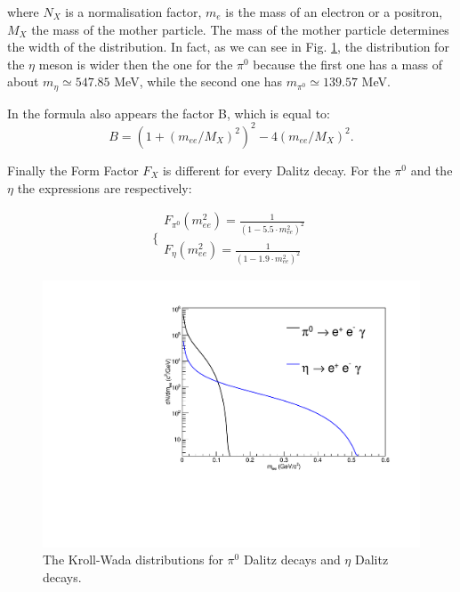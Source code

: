 \documentclass[a4paper,twocolumn,gsifonts,twoside]{gsipaper}
\begin{document}
where $N_{X}$ is a normalisation factor, $m_{e}$ is the mass of an electron or a positron, $M_{X}$ the mass of the mother particle.
The mass of the mother particle determines the width of the distribution. In fact, as we can see in Fig. \ref{kroll-wada}, the 
distribution for the $\eta$ meson is wider then the one for the $\pi^{0}$ because the first one has a mass of about $m_{\eta} \simeq 547.85$ 
MeV, while the second one has $m_{\pi^{0}} \simeq 139.57$ MeV.

In the formula also appears the factor B, which is equal to:
\vspace{0.2cm}
\begin{equation}
B=(1+(m_{ee}/M_{X})^{2})^2-4(m_{ee}/M_{X})^{2}.
\label{kroll_wada}
\end{equation}
\vspace{0.2cm}

Finally the Form Factor $F_{X}$ is different for every Dalitz decay. For the $\pi^{0}$ and the $\eta$ the expressions are respectively:

\vspace{0.2cm}
\begin{equation}
\Bigg\{
\begin{array}{rl}
F_{\pi^{0}}(m_{ee}^2) = \frac{1}{(1-5.5\cdot m_{ee}^2)^{2}}\\
F_{\eta}(m_{ee}^2) = \frac{1}{(1-1.9\cdot m_{ee}^2)^{2}}
\label{formfactors}
\end{array}
\end{equation}

\begin{figure}[htb]
\begin{center}
\advance\leftskip-0.5cm
\includegraphics[scale = 0.4]{dalitz_temp.pdf}
\caption{The Kroll-Wada distributions for $\pi^{0}$ Dalitz decays and $\eta$ Dalitz decays.}
\label{kroll-wada}
\end{center}
\end{figure}
\end{document}

